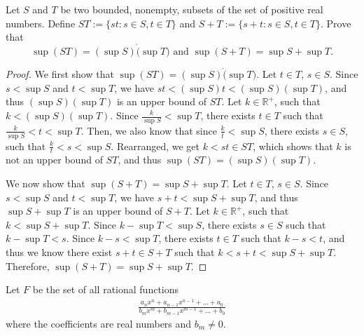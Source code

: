 \documentclass[addpoints, 11pt]{exam}
\newcommand*{\R}{\mathbb{R}}
\newenvironment{question}[1]{\smallskip\noindent\color{crimson}{\bf Question #1.}}{}
\begin{document}
\newpage

\begin{question}{C}
    Let $S$ and $T$ be two bounded, nonempty, subsets of the set of positive real numbers. Define $ST := \{st : s \in S, t \in T\}$ and $S + T := \{s + t : s \in S, t \in T\}$. Prove that 
    \[
        \sup(ST) = (\sup S) \dot (\sup T) \text{ and } \sup(S + T) = \sup S + \sup T.
    \]

\end{question}

\begin{proof}
    We first show that $\sup(ST) = (\sup S) \dot (\sup T)$. Let $t \in T$, $s \in S$. Since $s < \sup S$ and $t < \sup T$, we have $st < (\sup S)t < (\sup S)(\sup T)$, and thus $(\sup S)(\sup T)$ is an upper bound of $ST$. Let $k \in \R^{+}$, such that $k < (\sup S)(\sup T)$. Since $\frac{k}{\sup S} < \sup T$, there exists $t \in T$ such that $\frac{k}{\sup S} < t < \sup T$. Then, we also know that since $\frac{k}{t} < \sup S$, there exists $s \in S$, such that $\frac{k}{t} < s < \sup S$. Rearranged, we get $k < st \in ST$, which shows that $k$ is not an upper bound of $ST$, and thus $\sup(ST) = (\sup S)(\sup T)$.

    We now show that $\sup(S + T) = \sup S + \sup T$. Let $t \in T$, $s \in S$. Since $s < \sup S$ and $t < \sup T$, we have $s + t < \sup S + \sup T$, and thus $\sup S + \sup T$ is an upper bound of $S + T$. Let $k \in \R^{+}$, such that $k < \sup S + \sup T$. Since $k - \sup T < \sup S$, there exists $s \in S$ such that $k - \sup T < s$. Since $k - s < \sup T$, there exists $t \in T$ such that $k - s < t$, and thus we know there exist $s + t \in S + T$ such that $k < s + t < \sup S + \sup T$. Therefore, $\sup(S + T) = \sup S + \sup T$.
\end{proof}

\newpage

\begin{question}{D}
    Let $F$ be the set of all rational functions\
    \begin{gather}
        \frac{a_nx^n + a_{n - 1}x^{n - 1} + \dots + a_0}{b_mx^m + b_{m - 1}x^{m - 1} + \dots + b_0}
    \end{gather}
    where the coefficients are real numbers and $b_m \neq 0$.
\end{question}
\end{document}
